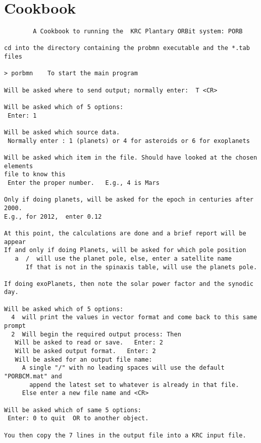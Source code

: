 \documentclass[draft]{article}  %
\begin{document}
\section{Cookbook \label{cook}} %
\vspace{-3.mm}
\begin{verbatim}
        A Cookbook to running the  KRC Plantary ORBit system: PORB

cd into the directory containing the probmn executable and the *.tab files

> porbmn    To start the main program

Will be asked where to send output; normally enter:  T <CR>

Will be asked which of 5 options:
 Enter: 1

Will be asked which source data.
 Normally enter : 1 (planets) or 4 for asteroids or 6 for exoplanets

Will be asked which item in the file. Should have looked at the chosen elements
file to know this
 Enter the proper number.   E.g., 4 is Mars

Only if doing planets, will be asked for the epoch in centuries after 2000. 
E.g., for 2012,  enter 0.12
 
At this point, the calculations are done and a brief report will be appear
If and only if doing Planets, will be asked for which pole position
   a  /  will use the planet pole, else, enter a satellite name
      If that is not in the spinaxis table, will use the planets pole.

If doing exoPlanets, then note the solar power factor and the synodic day.

Will be asked which of 5 options:
  4  will print the values in vector format and come back to this same prompt
  2  Will begin the required output process: Then
   Will be asked to read or save.   Enter: 2
   Will be asked output format.   Enter: 2
   Will be asked for an output file name: 
     A single "/" with no leading spaces will use the default "PORBCM.mat" and
       append the latest set to whatever is already in that file.
     Else enter a new file name and <CR>

Will be asked which of same 5 options:
 Enter: 0 to quit  OR to another object.

You then copy the 7 lines in the output file into a KRC input file.
\end{verbatim}
\end{document}
